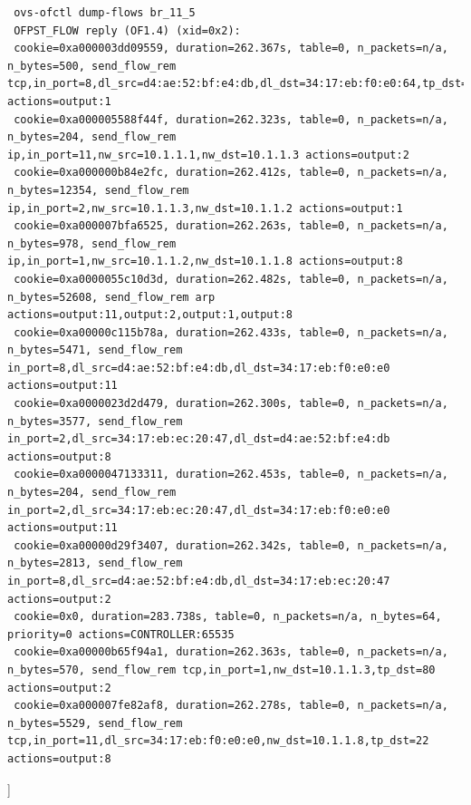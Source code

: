 \documentclass[a4paper]{article}
\begin{document}
\begin{verbatim}
 ovs-ofctl dump-flows br_11_5
 OFPST_FLOW reply (OF1.4) (xid=0x2):
 cookie=0xa000003dd09559, duration=262.367s, table=0, n_packets=n/a, n_bytes=500, send_flow_rem tcp,in_port=8,dl_src=d4:ae:52:bf:e4:db,dl_dst=34:17:eb:f0:e0:64,tp_dst=80 actions=output:1
 cookie=0xa000005588f44f, duration=262.323s, table=0, n_packets=n/a, n_bytes=204, send_flow_rem ip,in_port=11,nw_src=10.1.1.1,nw_dst=10.1.1.3 actions=output:2
 cookie=0xa000000b84e2fc, duration=262.412s, table=0, n_packets=n/a, n_bytes=12354, send_flow_rem ip,in_port=2,nw_src=10.1.1.3,nw_dst=10.1.1.2 actions=output:1
 cookie=0xa000007bfa6525, duration=262.263s, table=0, n_packets=n/a, n_bytes=978, send_flow_rem ip,in_port=1,nw_src=10.1.1.2,nw_dst=10.1.1.8 actions=output:8
 cookie=0xa0000055c10d3d, duration=262.482s, table=0, n_packets=n/a, n_bytes=52608, send_flow_rem arp actions=output:11,output:2,output:1,output:8
 cookie=0xa00000c115b78a, duration=262.433s, table=0, n_packets=n/a, n_bytes=5471, send_flow_rem in_port=8,dl_src=d4:ae:52:bf:e4:db,dl_dst=34:17:eb:f0:e0:e0 actions=output:11
 cookie=0xa0000023d2d479, duration=262.300s, table=0, n_packets=n/a, n_bytes=3577, send_flow_rem in_port=2,dl_src=34:17:eb:ec:20:47,dl_dst=d4:ae:52:bf:e4:db actions=output:8
 cookie=0xa0000047133311, duration=262.453s, table=0, n_packets=n/a, n_bytes=204, send_flow_rem in_port=2,dl_src=34:17:eb:ec:20:47,dl_dst=34:17:eb:f0:e0:e0 actions=output:11
 cookie=0xa00000d29f3407, duration=262.342s, table=0, n_packets=n/a, n_bytes=2813, send_flow_rem in_port=8,dl_src=d4:ae:52:bf:e4:db,dl_dst=34:17:eb:ec:20:47 actions=output:2
 cookie=0x0, duration=283.738s, table=0, n_packets=n/a, n_bytes=64, priority=0 actions=CONTROLLER:65535
 cookie=0xa00000b65f94a1, duration=262.363s, table=0, n_packets=n/a, n_bytes=570, send_flow_rem tcp,in_port=1,nw_dst=10.1.1.3,tp_dst=80 actions=output:2
 cookie=0xa000007fe82af8, duration=262.278s, table=0, n_packets=n/a, n_bytes=5529, send_flow_rem tcp,in_port=11,dl_src=34:17:eb:f0:e0:e0,nw_dst=10.1.1.8,tp_dst=22 actions=output:8   
\end{verbatim}]
 

\label{sec:task3}

\newpage


\end{document}
